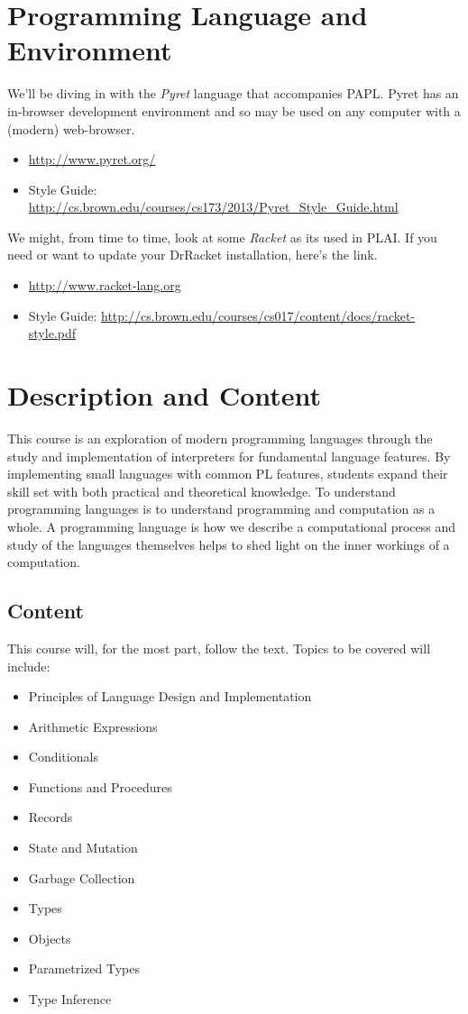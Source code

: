 \documentclass[10pt]{article}
\begin{document}
\section{Programming Language and Environment}

We'll be diving in with the \textit{Pyret} language that accompanies PAPL. Pyret has an in-browser development environment and so may be used on any computer with a (modern) web-browser.
\begin{itemize}
\item \url{http://www.pyret.org/}
\item Style Guide: \url{http://cs.brown.edu/courses/cs173/2013/Pyret_Style_Guide.html}
\end{itemize}

\noindent
We might, from time to time, look at some \textit{Racket} as its used in PLAI.  If you need or want to update your DrRacket installation, here's the link.
\begin{itemize}
\item \url{http://www.racket-lang.org}
\item Style Guide: \url{http://cs.brown.edu/courses/cs017/content/docs/racket-style.pdf}
\end{itemize}

\section{Description and Content}
This course is an exploration of modern programming languages through the study and implementation of  interpreters for fundamental language features.  By implementing small languages with common PL features, students expand their skill set with both practical and theoretical knowledge.  To understand programming languages is to understand programming and computation as a whole.  A programming language is how we describe a computational process and study of the languages themselves helps to shed light on the inner workings of a computation.

\subsection{Content}

This course will, for the most part, follow the text.  Topics to be covered will include:
\begin{itemize}
\item Principles of Language Design and Implementation 
\item Arithmetic Expressions
\item Conditionals
\item Functions and Procedures
\item Records
\item State and Mutation
\item Garbage Collection
\item Types
\item Objects
\item Parametrized Types 
\item Type Inference
\end{itemize}
\end{document}
